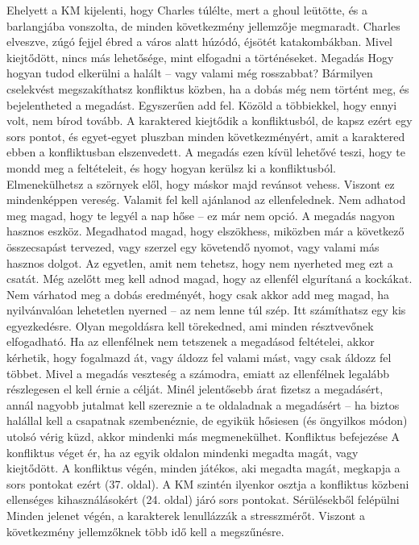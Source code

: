 \documentclass[oneside]{book}
\begin{document}
Ehelyett a KM kijelenti, hogy Charles túlélte, mert a ghoul leütötte, és a barlangjába vonszolta, de minden következmény jellemzője megmaradt. Charles elveszve, zúgó fejjel ébred a város alatt húzódó, éjsötét katakombákban. Mivel kiejtődött, nincs más lehetősége, mint elfogadni a történéseket.
Megadás
Hogy hogyan tudod elkerülni a halált – vagy valami még rosszabbat? Bármilyen cselekvést megszakíthatsz konfliktus közben, ha a dobás még nem történt meg, és bejelentheted a megadást. Egyszerűen add fel. Közöld a többiekkel, hogy ennyi volt, nem bírod tovább. A karaktered kiejtődik a konfliktusból, de kapsz ezért egy sors pontot, és egyet‑egyet pluszban minden következményért, amit a karaktered ebben a konfliktusban elszenvedett.
A megadás ezen kívül lehetővé teszi, hogy te mondd meg a feltételeit, és hogy hogyan kerülsz ki a konfliktusból. Elmenekülhetsz a szörnyek elől, hogy máskor majd revánsot vehess. Viszont ez mindenképpen vereség. Valamit fel kell ajánlanod az ellenfelednek. Nem adhatod meg magad, hogy te legyél a nap hőse – ez már nem opció.
A megadás nagyon hasznos eszköz. Megadhatod magad, hogy elszökhess, miközben már a következő összecsapást tervezed, vagy szerzel egy követendő nyomot, vagy valami más hasznos dolgot. Az egyetlen, amit nem tehetsz, hogy nem nyerheted meg ezt a csatát.
Még azelőtt meg kell adnod magad, hogy az ellenfél elgurítaná a kockákat. Nem várhatod meg a dobás eredményét, hogy csak akkor add meg magad, ha nyilvánvalóan lehetetlen nyerned – az nem lenne túl szép.
Itt számíthatsz egy kis egyezkedésre. Olyan megoldásra kell törekedned, ami minden résztvevőnek elfogadható. Ha az ellenfélnek nem tetszenek a megadásod feltételei, akkor kérhetik, hogy fogalmazd át, vagy áldozz fel valami mást, vagy csak áldozz fel többet. Mivel a megadás veszteség a számodra, emiatt az ellenfélnek legalább részlegesen el kell érnie a célját.
Minél jelentősebb árat fizetsz a megadásért, annál nagyobb jutalmat kell szereznie a te oldaladnak a megadásért – ha biztos halállal kell a csapatnak szembenéznie, de egyikük hősiesen (és öngyilkos módon) utolsó vérig küzd, akkor mindenki más megmenekülhet.
Konfliktus befejezése
A konfliktus véget ér, ha az egyik oldalon mindenki megadta magát, vagy kiejtődött. A konfliktus végén, minden játékos, aki megadta magát, megkapja a sors pontokat ezért (37. oldal). A KM szintén ilyenkor osztja a konfliktus közbeni ellenséges kihasználásokért (24. oldal) járó sors pontokat.
Sérülésekből felépülni
Minden jelenet végén, a karakterek lenullázzák a stresszmérőt. Viszont a következmény jellemzőknek több idő kell a megszűnésre.
\end{document}
